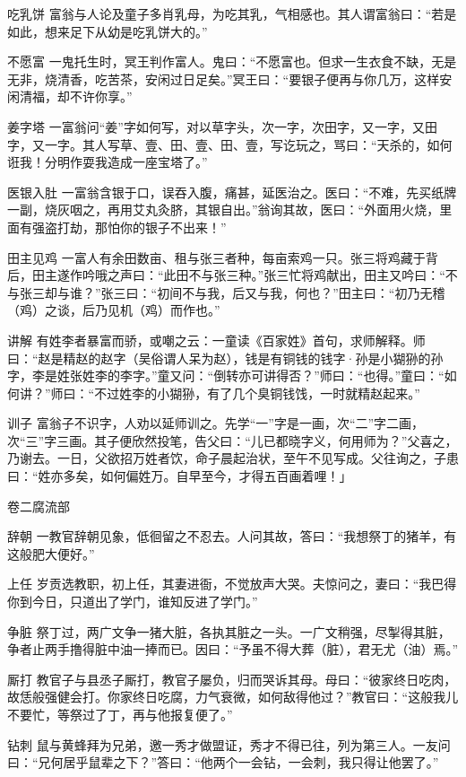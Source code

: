 \documentclass[12pt,UTF8]{ctexbook}
\begin{document}
吃乳饼
富翁与人论及童子多肖乳母，为吃其乳，气相感也。其人谓富翁曰：“若是如此，想来足下从幼是吃乳饼大的。”

不愿富
一鬼托生时，冥王判作富人。鬼曰：“不愿富也。但求一生衣食不缺，无是无非，烧清香，吃苦茶，安闲过日足矣。”冥王曰：“要银子便再与你几万，这样安闲清福，却不许你享。”

姜字塔
一富翁问“姜”字如何写，对以草字头，次一字，次田字，又一字，又田字，又一字。其人写草、壹、田、壹、田、壹，写讫玩之，骂曰：“天杀的，如何诳我！分明作耍我造成一座宝塔了。”

医银入肚
一富翁含银于口，误吞入腹，痛甚，延医治之。医曰：“不难，先买纸牌一副，烧灰咽之，再用艾丸灸脐，其银自出。”翁询其故，医曰：“外面用火烧，里面有强盗打劫，那怕你的银子不出来！”

田主见鸡
一富人有余田数亩、租与张三者种，每亩索鸡一只。张三将鸡藏于背后，田主遂作吟哦之声曰：“此田不与张三种。”张三忙将鸡献出，田主又吟曰：“不与张三却与谁？”张三曰：“初间不与我，后又与我，何也？”田主曰：“初乃无稽（鸡）之谈，后乃见机（鸡）而作也。”

讲解
有姓李者暴富而骄，或嘲之云：一童读《百家姓》首句，求师解释。师曰：“赵是精赵的赵字（吴俗谓人呆为赵），钱是有铜钱的钱字·孙是小猢狲的孙字，李是姓张姓李的李字。”童又问：“倒转亦可讲得否？”师曰：“也得。”童曰：“如何讲？”师曰：“不过姓李的小猢狲，有了几个臭铜钱饯，一时就精赵起来。”

训子
富翁子不识字，人劝以延师训之。先学“一”字是一画，次“二”字二画，次“三”字三画。其子便欣然投笔，告父曰：“儿已都晓字义，何用师为？”父喜之，乃谢去。一日，父欲招万姓者饮，命子晨起治状，至午不见写成。父往询之，子患曰：“姓亦多矣，如何偏姓万。自早至今，才得五百画着哩！」

卷二腐流部

辞朝
一教官辞朝见象，低徊留之不忍去。人问其故，答曰：“我想祭丁的猪羊，有这般肥大便好。”

上任
岁贡选教职，初上任，其妻进衙，不觉放声大哭。夫惊问之，妻曰：“我巴得你到今日，只道出了学门，谁知反进了学门。”

争脏
祭丁过，两广文争一猪大脏，各执其脏之一头。一广文稍强，尽掣得其脏，争者止两手撸得脏中油一捧而已。因曰：“予虽不得大葬（脏），君无尤（油）焉。”

厮打
教官子与县丞子厮打，教官子屡负，归而哭诉其母。母曰：“彼家终日吃肉，故恁般强健会打。你家终日吃腐，力气衰微，如何敌得他过？”教官曰：“这般我儿不要忙，等祭过了丁，再与他报复便了。”

钻刺
鼠与黄蜂拜为兄弟，邀一秀才做盟证，秀才不得已往，列为第三人。一友问曰：“兄何居乎鼠辈之下？”答曰：“他两个一会钻，一会刺，我只得让他罢了。”
\end{document}
